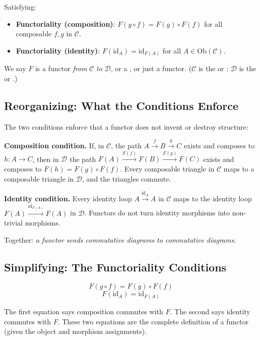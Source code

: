 Satisfying:
\begin{itemize}
  \item \textbf{Functoriality (composition)}: $F(g \circ f) = F(g) \circ F(f)$
        for all composable $f, g$ in $\mathcal{C}$.
  \item \textbf{Functoriality (identity)}: $F(\mathrm{id}_A) = \mathrm{id}_{F(A)}$
        for all $A \in \mathrm{Ob}(\mathcal{C})$.
\end{itemize}

We say $F$ is a functor \emph{from} $\mathcal{C}$ \emph{to} $\mathcal{D}$,
or a , or just a functor. ($\mathcal{C}$ is the
 or ; $\mathcal{D}$ is the  or
.)

\subsection{Reorganizing: What the Conditions Enforce}

The two conditions enforce that a functor does not invent or destroy structure:

\textbf{Composition condition.} If, in $\mathcal{C}$, the path
$A \xrightarrow{f} B \xrightarrow{g} C$ exists and composes to $h : A \to C$,
then in $\mathcal{D}$ the path $F(A) \xrightarrow{F(f)} F(B) \xrightarrow{F(g)}
F(C)$ exists and composes to $F(h) = F(g) \circ F(f)$. Every composable
triangle in $\mathcal{C}$ maps to a composable triangle in $\mathcal{D}$,
and the triangles commute.

\textbf{Identity condition.} Every identity loop $A \xrightarrow{\mathrm{id}_A} A$
in $\mathcal{C}$ maps to the identity loop $F(A) \xrightarrow{\mathrm{id}_{F(A)}}
F(A)$ in $\mathcal{D}$. Functors do not turn identity morphisms into
non-trivial morphisms.

Together: \emph{a functor sends commutative diagrams to commutative diagrams}.

\subsection{Simplifying: The Functoriality Conditions}

\[
  F(g \circ f) = F(g) \circ F(f)
\]
\[
  F(\mathrm{id}_A) = \mathrm{id}_{F(A)}
\]

The first equation says composition commutes with $F$. The second says
identity commutes with $F$. These two equations are the complete definition
of a functor (given the object and morphism assignments).

